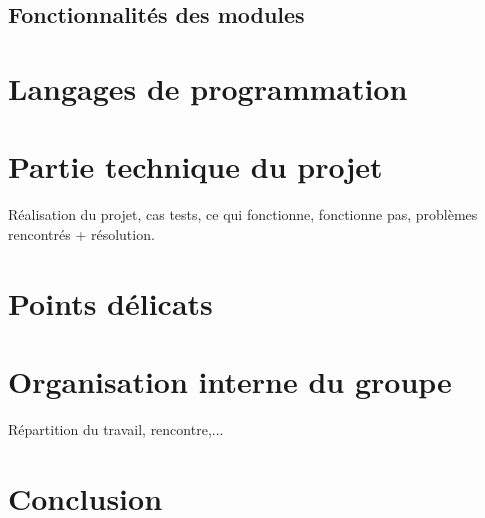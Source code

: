 		\subsection{Fonctionnalités des modules}
	\section{Langages de programmation}
	\section{Partie technique du projet}
		Réalisation du projet, cas tests, ce qui fonctionne, fonctionne pas, problèmes rencontrés + résolution.
	\section{Points délicats}
	\section{Organisation interne du groupe}
		Répartition du travail, rencontre,...
	
	\section*{Conclusion}
		
		

